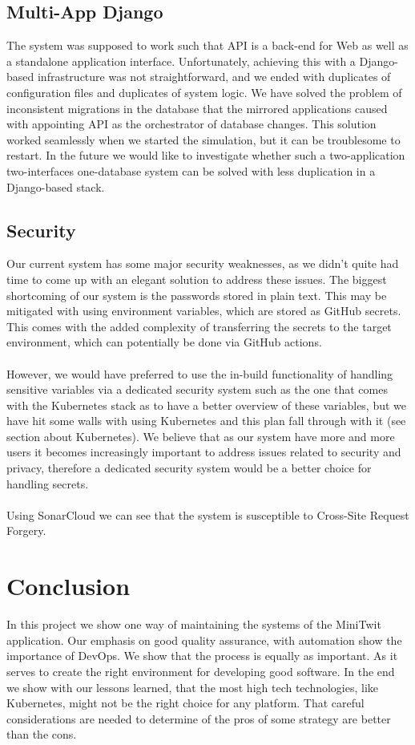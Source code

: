 \documentclass[12pt]{article}
\begin{document}
\subsection{Multi-App Django}

The system was supposed to work such that API is a back-end for Web as well as a standalone application interface. Unfortunately, achieving this with a Django-based infrastructure was not straightforward, and we ended with duplicates of configuration files and duplicates of system logic. We have solved the problem of inconsistent migrations in the database that the mirrored applications caused with appointing API as the orchestrator of database changes. This solution worked seamlessly when we started the simulation, but it can be troublesome to restart. In the future we would like to investigate whether such a two-application two-interfaces one-database system can be solved with less duplication in a Django-based stack.


\subsection{Security}
Our current system has some major security weaknesses, as we didn't quite had time to come up with an elegant solution to address these issues. The biggest shortcoming of our system is the passwords stored in plain text. This may be mitigated with using environment variables, which are stored as GitHub secrets. This comes with the added complexity of transferring the secrets to the target environment, which can potentially be done via GitHub actions. 
\\\\
However, we would have preferred to use the in-build functionality of handling sensitive variables via a dedicated security system such as the one that comes with the Kubernetes stack as to have a better overview of these variables, but we have hit some walls with using Kubernetes and this plan fall through with it (see section about Kubernetes). We believe that as our system have more and more users it becomes increasingly important to address issues related to security and privacy, therefore a dedicated security system would be a better choice for handling secrets. 
\\\\
Using SonarCloud we can see that the system is susceptible to Cross-Site Request Forgery.
\section{Conclusion}
In this project we show one way of maintaining the systems of the MiniTwit application. Our emphasis on good quality assurance, with automation show the importance of DevOps. We show that the process is equally as important. As it serves to create the right environment for developing good software. In the end we show with our lessons learned, that the most high tech technologies, like Kubernetes, might not be the right choice for any platform. That careful considerations are needed to determine of the pros of some strategy are better than the cons.
\end{document}
